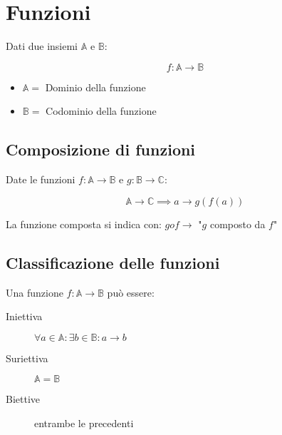 \documentclass{subfiles}
\begin{document}
\section{Funzioni}

Dati due insiemi $\mathbb{A}$ e $\mathbb{B}$:

$$
f: \mathbb{A} \to \mathbb{B}
$$

\begin{itemize}
    \item $\mathbb{A} =$ Dominio della funzione
    \item $\mathbb{B} =$ Codominio della funzione
\end{itemize}

\subsection{Composizione di funzioni}

Date le funzioni $f: \mathbb{A} \to \mathbb{B}$ e $g: \mathbb{B} \to \mathbb{C}$:

$$
\mathbb{A} \to \mathbb{C} \implies a \to g(f(a))
$$

\noindent
La funzione composta si indica con: $g o f \longrightarrow$ "$g$ composto da $f$"

\subsection{Classificazione delle funzioni}

Una funzione $f: \mathbb{A} \to \mathbb{B}$ può essere:

\begin{description}
    \item[Iniettiva] $\forall a \in \mathbb{A} : \exists b \in \mathbb{B}: a \to b$
    \item[Suriettiva] $\mathbb{A} = \mathbb{B}$
    \item[Biettive] entrambe le precedenti
\end{description}
\end{document}

